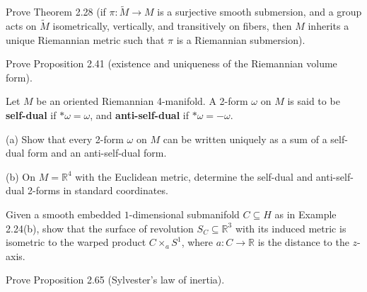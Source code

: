 \begin{exercise}\label{prob:riemannian-metric-submersion}


Prove Theorem 2.28 (if $\pi: \tilde{M} \to M$ is a surjective smooth submersion, and a group acts on $\tilde{M}$ isometrically, vertically, and transitively on fibers, then $M$ inherits a unique Riemannian metric such that $\pi$ is a Riemannian submersion).
\end{exercise}

\begin{exercise}
\label{prob:riemannian-volume-form-existence}


Prove Proposition 2.41 (existence and uniqueness of the Riemannian volume form).
\end{exercise}

\begin{exercise}\label{prob:self-dual-anti-self-dual}


Let $M$ be an oriented Riemannian 4-manifold. A 2-form $\omega$ on $M$ is said to be \textbf{self-dual} if $*\omega = \omega$, and \textbf{anti-self-dual} if $*\omega = -\omega$.

(a) Show that every 2-form $\omega$ on $M$ can be written uniquely as a sum of a self-dual form and an anti-self-dual form.

(b) On $M = \mathbb{R}^4$ with the Euclidean metric, determine the self-dual and anti-self-dual 2-forms in standard coordinates.
\end{exercise}

\begin{exercise}\label{prob:surface-of-revolution-warped-product}
Given a smooth embedded $1$-dimensional submanifold $C \subseteq H$ as in Example 2.24(b), show that the surface of revolution $S_C \subseteq \mathbb{R}^3$ with its induced metric is isometric to the warped product $C \times_a S^1$, where $a: C \to \mathbb{R}$ is the distance to the $z$-axis.
\end{exercise}

\begin{exercise}\label{prob:sylvesters-law-inertia}


Prove Proposition 2.65 (Sylvester's law of inertia).
\end{exercise}

